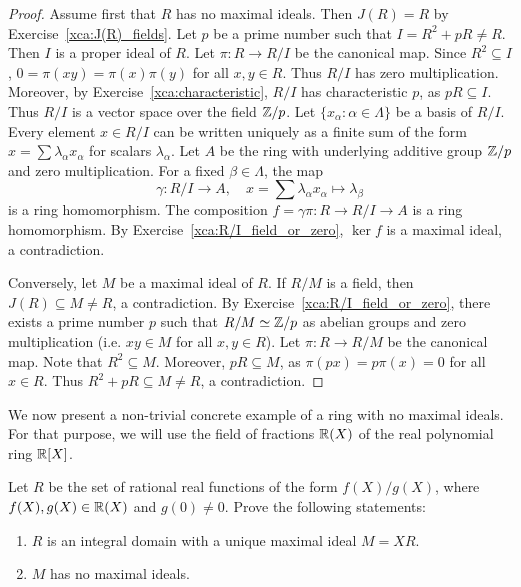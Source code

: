 \begin{proof}
    Assume first that $R$ has no maximal ideals. Then $J(R)=R$ by 
    Exercise~\ref{xca:J(R)_fields}. Let $p$ be a prime number
    such that $I=R^2+pR\ne R$. Then $I$ is a proper ideal of $R$. 
    Let $\pi\colon R\to R/I$ be the canonical map. Since $R^2\subseteq I$, 
    $0=\pi(xy)=\pi(x)\pi(y)$ for all $x,y\in R$. Thus $R/I$ has zero multiplication. 
    Moreover, by Exercise~\ref{xca:characteristic}, 
    $R/I$ has characteristic $p$, as $pR\subseteq I$.  
    Thus $R/I$ is a vector space 
    over the field $\mathbb{Z}/p$.
    Let $\{x_\alpha:\alpha\in\Lambda\}$ be a basis
    of $R/I$. Every element $x\in R/I$ can be written uniquely
    as a finite sum of the form 
    $x=\sum \lambda_{\alpha}x_{\alpha}$ for scalars $\lambda_\alpha$. 
    Let $A$ be the ring with underlying additive group $\mathbb{Z}/p$ and zero multiplication. 
    For a fixed
    $\beta\in\Lambda$, the map 
    \[
    \gamma\colon R/I\to A,\quad 
    x=\sum \lambda_{\alpha}x_{\alpha}\mapsto \lambda_{\beta}
    \]
    is a ring homomorphism. 
    The composition $f=\gamma\pi\colon R\to R/I\to A$ is a ring homomorphism. By Exercise~\ref{xca:R/I_field_or_zero}, $\ker f$ is a maximal ideal, a contradiction. 

    Conversely, let $M$ be a maximal ideal of $R$. If $R/M$ is a field, 
    then $J(R)\subseteq M\ne R$, a contradiction. 
    By Exercise~\ref{xca:R/I_field_or_zero},  there exists a prime
    number $p$ such that $R/M\simeq\mathbb{Z}/p$ as abelian groups and 
    zero multiplication (i.e. $xy\in M$ for all $x,y\in R$). 
    Let $\pi\colon R\to R/M$ be the canonical map. Note that 
    $R^2\subseteq M$. Moreover, $pR\subseteq M$, as 
    $\pi(px)=p\pi(x)=0$ for all $x\in R$. Thus $R^2+pR\subseteq M\ne R$, a contradiction. 
\end{proof}

We now present a non-trivial concrete example of a ring 
with no maximal ideals. For that purpose, we will use
the field of fractions $\mathbb{R}(X)$ of the real polynomial ring $\mathbb{R}[X]$.  

\begin{exercise}
    \label{xca:example}
    Let $R$ be the set of rational real functions of the form 
    $f(X)/g(X)$, where $f(X),g(X)\in\mathbb{R}(X)$ and $g(0)\ne 0$.  Prove the following statements:
    \begin{enumerate}
        \item $R$ is an integral domain with a unique maximal ideal $M=XR$.
        \item $M$ has no maximal ideals. 
    \end{enumerate}  
\end{exercise}

